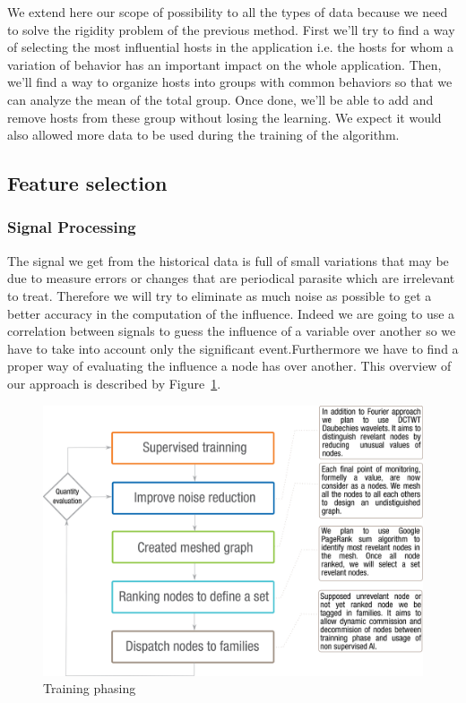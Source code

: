 \documentclass[10pt,a4paper,oneside]{article}
\begin{document}
\begin{multicols}{2}
We extend here our scope of possibility to all the types of data because we need to solve the rigidity problem of the previous method. First we'll try to find a way of selecting the most influential hosts in the application i.e. the hosts for whom a variation of behavior has an important impact on the whole application. Then, we'll find a way to organize hosts into groups with common behaviors so that we can analyze the mean of the total group. Once done, we'll be able to add and remove hosts from these group without losing the learning. We expect it would also allowed more data to be used during the training of the algorithm.
\end{multicols}

\vspace{0.8cm}

\begin{multicols}{2}

\subsection{Feature selection}
\subsubsection{Signal Processing}
The signal we get from the historical data is full of small variations that may be due to measure errors or changes that are periodical parasite which are irrelevant to treat. Therefore we will try to eliminate as much noise as possible to get a better accuracy in the computation of the influence. Indeed we are going to use a correlation between signals to guess the influence of a variable over another so we have to take into account only the significant event.Furthermore we have to find a proper way of evaluating the influence a node has over another. This overview of our approach is described by Figure~\ref{trng}.
\end{multicols}

\vspace{0.8cm}

\begin{figure}[!ht]
\centering
\includegraphics[scale=0.8]{./images/Apprentissage_V2.png}
\caption{Training phasing}
\label{trng}
\end{figure}
\end{document}

